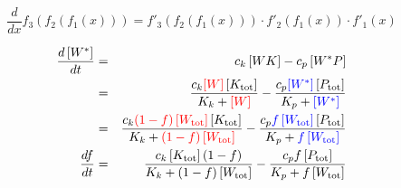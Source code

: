 \documentclass{article}
\begin{document}
\[ \frac{d}{dx} f_3 \left( f_2 \left( f_1 \left( x \right) \right) \right) = f'_3 \left( f_2 \left( f_1 \left( x \right) \right) \right) \cdot f'_2 \left( f_1 \left( x \right) \right) \cdot f'_1 \left( x \right) \]

\begin{eqnarray*}
\frac{d \left[ W^* \right] }{dt} & = &  c_k  \left[ WK \right] - c_p \left[ W^*P \right]\\
& = & \frac{c_k{ \color{red} \left[ W \right]}  \left[ K_{\textrm{tot}} \right]}{ K_k +  {\color{red} \left[ W \right]}} - \frac{c_p {\color{blue} \left[ W^* \right]}  \left[ P_{\textrm{tot}} \right]}{ K_p + {\color{blue} \left[ W^* \right]} }\\
& = & \frac{c_k {\color{red} \left( 1 - f \right) \left[ W_{\textrm{tot}} \right]}  \left[ K_{\textrm{tot}} \right]}{ K_k + {\color{red} \left( 1 - f \right) \left[ W_{\textrm{tot}} \right]}} - \frac{c_p {\color{blue}f \left[ W_{\textrm{tot}} \right]}  \left[ P_{\textrm{tot}} \right]}{ K_p + {\color{blue} f \left[ W_{\textrm{tot}} \right]}}\\
\frac{d f}{dt} & = & \frac{c_k  \left[ K_{\textrm{tot}} \right] \left( 1 - f \right)}{ K_k +   \left( 1 - f \right) \left[ W_{\textrm{tot}} \right]} - \frac{c_p f \left[ P_{\textrm{tot}} \right]}{ K_p +  f \left[ W_{\textrm{tot}} \right]}
\end{eqnarray*}
\end{document}
